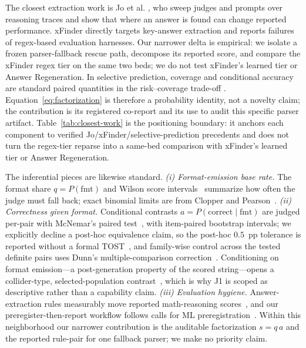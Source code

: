 \documentclass{article}
\begin{document}
The closest extraction work is Jo et al. \citep{jo2025finding}, who sweep
judges and prompts over reasoning traces and show that where an answer is found
can change reported performance.  xFinder \citep{yu2024xfinder} directly
targets key-answer extraction and reports failures of regex-based evaluation
harnesses.  Our narrower delta is empirical: we isolate a frozen
parser-fallback rescue path, decompose its reported score, and compare the
xFinder regex tier on the same two beds; we do not test xFinder's learned tier
or Answer Regeneration.  In selective prediction, coverage and conditional
accuracy are standard paired quantities in the risk--coverage trade-off
\citep{elyaniv2010selective}.  Equation~\ref{eq:factorization} is therefore a
probability identity, not a novelty claim; the contribution is its registered
co-report and its use to audit this specific parser artifact.
Table~\ref{tab:closest-work} is the positioning boundary: it anchors each
component to verified Jo/xFinder/selective-prediction precedents and does not
turn the regex-tier reparse into a same-bed comparison with xFinder's learned
tier or Answer Regeneration.

The inferential pieces are likewise standard.
\emph{(i) Format-emission base rate.}  The format share $q=P(\mathrm{fmt})$
and Wilson score intervals~\citep{wilson1927probable} summarize how often the
judge must fall back; exact binomial limits are from Clopper and
Pearson~\citep{clopper1934use}.
\emph{(ii) Correctness given format.}  Conditional contrasts
$a=P(\mathrm{correct}\mid\mathrm{fmt})$ are judged per-pair with McNemar's
paired test~\citep{mcnemar1947note}, with item-paired bootstrap intervals; we
explicitly decline a post-hoc equivalence claim, so the post-hoc $0.5$~pp tolerance is
reported without a formal
TOST~\citep{schuirmann1987comparison}, and family-wise control across the
tested definite pairs uses Dunn's multiple-comparison
correction~\citep{dunn1961multiple}.  Conditioning on format emission---a
post-generation property of the scored string---opens a collider-type,
selected-population contrast~\citep{elwert2014endogenous}, which is why J1 is
scoped as descriptive rather than a capability claim.
\emph{(iii) Evaluation hygiene.}  Answer-extraction rules measurably move
reported math-reasoning scores~\citep{jo2025finding,yu2024xfinder}, and our
preregister-then-report workflow follows calls for ML
preregistration~\citep{forde2019scientific}.  Within this neighborhood our
narrower contribution is the auditable factorization $s=q\,a$ and the
reported rule-pair for one fallback parser; we make no priority claim.
\end{document}
